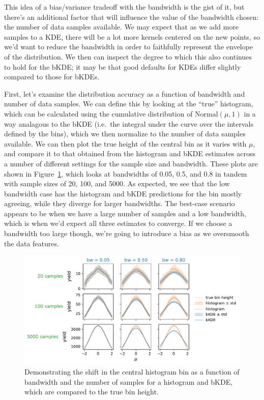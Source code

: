 \documentclass[
  11pt,
  numbers=noendperiod]{book}
\begin{document}
This idea of a bias/variance tradeoff with the bandwidth is the gist of
it, but there's an additional factor that will influence the value of
the bandwidth chosen: the number of data samples available. We may
expect that as we add more samples to a KDE, there will be a lot more
kernels centered on the new points, so we'd want to reduce the bandwidth
in order to faithfully represent the envelope of the distribution. We
then can inspect the degree to which this also continues to hold for the
bKDE; it may be that good defaults for KDEs differ slightly compared to
those for bKDEs.

First, let's examine the distribution accuracy as a function of
bandwidth and number of data samples. We can define this by looking at
the ``true'' histogram, which can be calculated using the cumulative
distribution of \(\mathrm{Normal}(\mu, 1)\) in a way analagous to the
bKDE (i.e.~the integral under the curve over the intervals defined by
the bins), which we then normalize to the number of data samples
available. We can then plot the true height of the central bin as it
varies with \(\mu\), and compare it to that obtained from the histogram
and bKDE estimates across a number of different settings for the sample
size and bandwidth. These plots are shown in
Figure~\ref{fig-bin-height-all}, which looks at bandwidths of 0.05, 0.5,
and 0.8 in tandem with sample sizes of 20, 100, and 5000. As expected,
we see that the low bandwidth case has the histogram and bKDE
predictions for the bin mostly agreeing, while they diverge for larger
bandwidths. The best-case scenario appears to be when we have a large
number of samples and a low bandwidth, which is when we'd expect all
three estimates to converge. If we choose a bandwidth too large though,
we're going to introduce a bias as we oversmooth the data features.

\begin{figure}

{\centering \includegraphics{./diffprog-hep_files/figure-pdf/fig-bin-height-all-output-1.pdf}

}

\caption{\label{fig-bin-height-all}Demonstrating the shift in the
central histogram bin as a function of bandwidth and the number of
samples for a histogram and bKDE, which are compared to the true bin
height.}

\end{figure}
\end{document}
